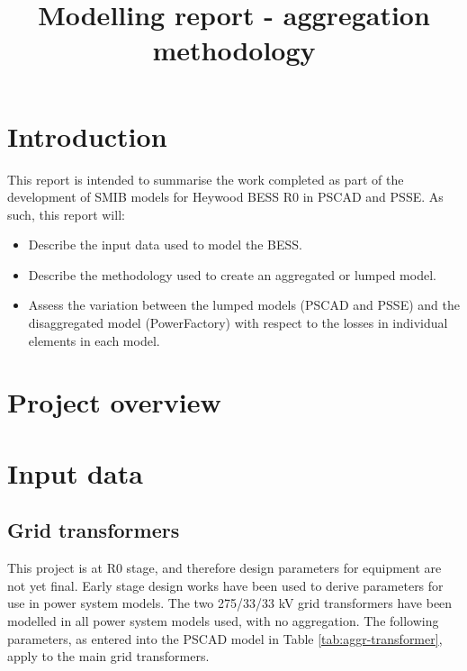 \documentclass{../grid-link-report}
\title{Modelling report - aggregation methodology}
\newcommand{\projectassetsdir}{../project-assets}
\begin{document}
	
	\frontmatter
	\maketitle  
	
	\makedisclaimer
	\clearpage
	\tableofcontents
	\makerevisionhistorypage
	
	\mainmatter
	
	\chapter{Introduction}
	This report is intended to summarise the work completed as part of the development of SMIB models for Heywood BESS R0 in PSCAD and PSSE. As such, this report will:
	
	\begin{itemize}
		\item Describe the input data used to model the \acs{BESS}.
		\item Describe the methodology used to create an aggregated or lumped model.
		\item Assess the variation between the lumped models (PSCAD and PSSE) and the disaggregated model (PowerFactory) with respect to the losses in individual elements in each model.
	\end{itemize}

	\chapter{Project overview}
	

	\chapter{Input data}
	\label{Input Data}
	\section{Grid transformers}
	
	This project is at R0 stage, and therefore design parameters for equipment are not yet final. Early stage design works have been used to derive parameters for use in power system models. The two 275/33/33 kV grid transformers have been modelled in all power system models used, with no aggregation. The following parameters, as entered into the PSCAD model in Table \ref{tab:aggr-transformer}, apply to the main grid transformers.
	
\end{document}
